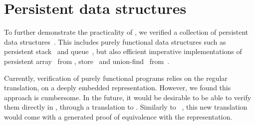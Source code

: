 \section{Persistent data structures}
\label{sec:persistent}

To further demonstrate the practicality of \Zoo, we verified a collection of persistent data structures~.
This includes purely functional data structures such as persistent stack~ and queue~, but also efficient imperative implementations of persistent array~ from \citet*{DBLP:conf/ml/ConchonF07}, store~ and union-find~ from~\citet*{DBLP:journals/pacmpl/AllainC0S24}.

Currently, verification of purely functional programs relies on the regular \ZooLang translation, \ie on a deeply embedded representation.
However, we found this approach is cumbersome.
In the future, it would be desirable to be able to verify them directly in \Rocq, through a translation to \Gallina.
Similarly to \Hacspec~\citep*{DBLP:conf/cpp/HaselwarterHHWH24}, this new translation would come with a generated proof of equivalence with the \ZooLang representation.

